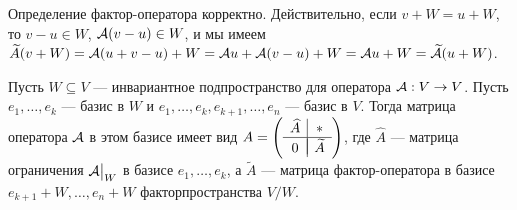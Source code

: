 Определение фактор-оператора корректно. Действительно, если $v + W = u + W$, то $v - u \in W$, $\mathcal{A}(v - u) \in W$, и мы имеем $\widetilde{A}(v + W) = \mathcal{A}(u + v - u) + W = \mathcal{A} u + \mathcal{A}(v - u) + W = \mathcal{A} u + W = \widetilde{\mathcal{A}}(u + W)$.

\begin{proposal}
    Пусть $W \subseteq V$ --- инвариантное подпространство для оператора $\mathcal{A}: V \to V$. Пусть $e_1, \ldots, e_k$ --- базис в $W$ и $e_1, \ldots, e_k, e_{k + 1}, \ldots, e_n$ --- базис в $V$. Тогда матрица оператора $\mathcal{A}$ в этом базисе имеет вид
    $
    A =
    \left(
    \begin{array}{c | c}
        \widehat{A} & \ast\\
        \hline\vspace{-4mm}\\
        0 & \widetilde{A}
    \end{array}
    \right)
    $, где $\widehat{A}$ --- матрица ограничения $\mathcal{A}\big|_W$ в базисе $e_1, \ldots, e_k$, а $\widetilde{A}$ --- матрица фактор-оператора в базисе $e_{k + 1} + W, \ldots, e_n + W$ факторпространства $V / W$.
\end{proposal}

